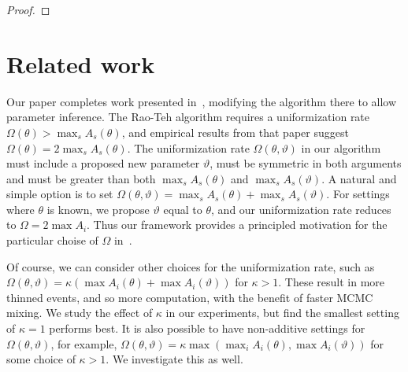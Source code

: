 \begin{proof}
\end{proof}

\section{Related work}\label{sec:comments}

Our paper completes work presented in~\citet{RaoTeh13}, modifying the algorithm there to allow parameter inference.
The Rao-Teh algorithm requires a uniformization rate $\Omega(\theta) > \max_s A_s(\theta)$, and empirical results from that paper suggest $\Omega(\theta) = 2\max_s A_s(\theta)$.
The uniformization rate $\Omega(\theta,\vartheta)$ in our algorithm must include a proposed new parameter $\vartheta$, must be symmetric in both arguments and must be greater than both $\max_s A_s(\theta)$ and $\max_s A_s(\vartheta)$. A natural and simple option is to set $\Omega(\theta,\vartheta) = \max_s A_s(\theta) + \max_s A_s(\vartheta)$. 
For settings where $\theta$ is known, we propose $\vartheta$ equal to $\theta$, and our uniformization rate reduces to $\Omega = 2\max A_i$. 
Thus our framework provides a principled motivation for the particular choise of $\Omega$ in~\citet{RaoTeh13}.

Of course, we can consider other choices for the uniformization rate, such as $\Omega(\theta,\vartheta) = \kappa(\max A_i(\theta) + \max A_i(\vartheta))$ for $\kappa > 1$.  These result in more thinned events, and so more computation, with the benefit of faster MCMC mixing. We study the effect of 
$\kappa$ in our experiments, but find the smallest setting of $\kappa=1$ performs best.
It is also possible to have non-additive settings for $\Omega(\theta,\vartheta)$, for example, $\Omega(\theta,\vartheta) = \kappa \max( \max_i A_i(\theta), \max A_i(\vartheta))$ for some choice of $\kappa > 1$. We investigate this as well.

